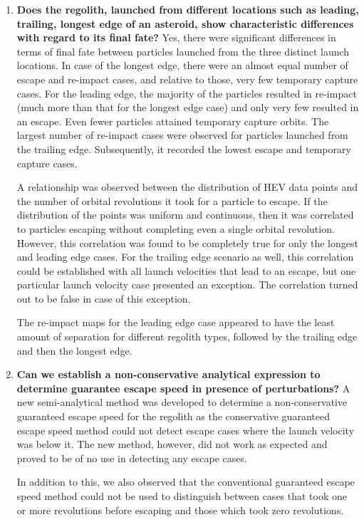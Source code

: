 \begin{enumerate}
\item \textbf{Does the regolith, launched from different locations such as leading, trailing, longest edge of an asteroid, show characteristic differences with regard to its final fate?} \newline
Yes, there were significant differences in terms of final fate between particles launched from the three distinct launch locations. In case of the longest edge, there were an almost equal number of escape and re-impact cases, and relative to those, very few temporary capture cases. For the leading edge, the majority of the particles resulted in re-impact (much more than that for the longest edge case) and only very few resulted in an escape. Even fewer particles attained temporary capture orbits. The largest number of re-impact cases were observed for particles launched from the trailing edge. Subsequently, it recorded the lowest escape and temporary capture cases.

A relationship was observed between the distribution of \gls{HEV} data points and the number of orbital revolutions it took for a particle to escape. If the distribution of the points was uniform and continuous, then it was correlated to particles escaping without completing even a single orbital revolution. However, this correlation was found to be completely true for only the longest and leading edge cases. For the trailing edge scenario as well, this correlation could be established with all launch velocities that lead to an escape, but one particular launch velocity case presented an exception. The correlation turned out to be false in case of this exception.

The re-impact maps for the leading edge case appeared to have the least amount of separation for different regolith types, followed by the trailing edge and then the longest edge.

\item \textbf{Can we establish a non-conservative analytical expression to determine guarantee escape speed in presence of perturbations?}\newline
A new semi-analytical method was developed to determine a non-conservative guaranteed escape speed for the regolith as the conservative guaranteed escape speed method could not detect escape cases where the launch velocity was below it. The new method, however, did not work as expected and proved to be of no use in detecting any escape cases.

In addition to this, we also observed that the conventional guaranteed escape speed method could not be used to distinguish between cases that took one or more revolutions before escaping and those which took zero revolutions.


\end{enumerate}
